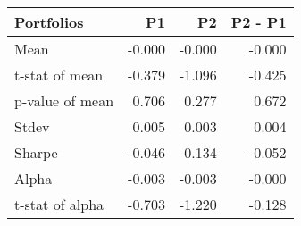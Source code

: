 \begin{tabular}{lrrr}
\toprule
Portfolios & P1 & P2 & P2 - P1 \\
\midrule
Mean & -0.000 & -0.000 & -0.000 \\
t-stat of mean & -0.379 & -1.096 & -0.425 \\
p-value of mean & 0.706 & 0.277 & 0.672 \\
Stdev & 0.005 & 0.003 & 0.004 \\
Sharpe & -0.046 & -0.134 & -0.052 \\
Alpha & -0.003 & -0.003 & -0.000 \\
t-stat of alpha & -0.703 & -1.220 & -0.128 \\
\bottomrule
\end{tabular}
